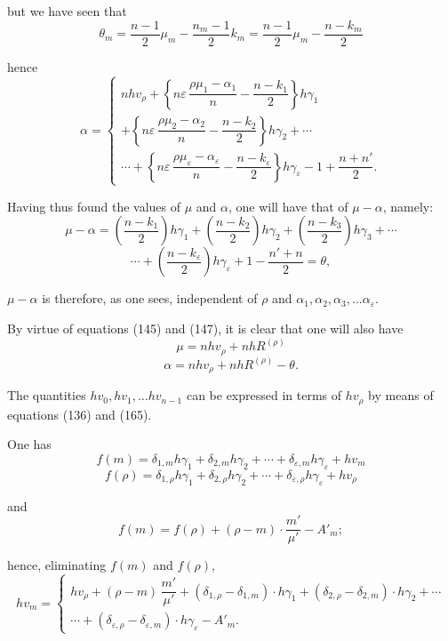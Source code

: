 \documentclass{article}
\begin{document}
but we have seen that
\[ \theta_m = \frac{n-1}{2}\mu_m - \frac{n_m-1}{2}k_m = \frac{n-1}{2}\mu_m - \frac{n-k_m}{2} \]

hence
\[ \alpha = \begin{cases}
nhv_\rho + \left\{n\varepsilon\,\dfrac{\rho\mu_1-\alpha_1}{n} - \dfrac{n-k_1}{2}\right\}h\gamma_1 \\
+ \left\{n\varepsilon\,\dfrac{\rho\mu_2-\alpha_2}{n} - \dfrac{n-k_2}{2}\right\}h\gamma_2+\cdots \\
\cdots+\left\{n\varepsilon\,\dfrac{\rho\mu_\varepsilon-\alpha_\varepsilon}{n}-\dfrac{n-k_\varepsilon}{2}\right\}h\gamma_\varepsilon-1+\dfrac{n+n'}{2}. \tag{171}
\end{cases} \]

Having thus found the values of $\mu$ and $\alpha$, one will have that of $\mu-\alpha$, namely:
\[ \mu-\alpha = \left(\frac{n-k_1}{2}\right)h\gamma_1 + \left(\frac{n-k_2}{2}\right)h\gamma_2 + \left(\frac{n-k_3}{2}\right)h\gamma_3+\cdots \]
\[ \cdots+\left(\frac{n-k_\varepsilon}{2}\right)h\gamma_\varepsilon+1-\frac{n'+n}{2} = \theta, \tag{172} \]

$\mu-\alpha$ is therefore, as one sees, independent of $\rho$ and $\alpha_1, \alpha_2, \alpha_3, \ldots \alpha_\varepsilon$.

By virtue of equations (145) and (147), it is clear that one will also have
\[ \mu = nhv_\rho + nhR^{(\rho)} \tag{173} \]
\[ \alpha = nhv_\rho + nhR^{(\rho)} - \theta. \tag{174} \]

The quantities $hv_0, hv_1, \ldots hv_{n-1}$ can be expressed in terms of $hv_\rho$ by means of equations (136) and (165).

One has
\[ f(m) = \delta_{1,m}h\gamma_1+\delta_{2,m}h\gamma_2+\cdots+\delta_{\varepsilon,m}h\gamma_\varepsilon+hv_m \]
\[ f(\rho) = \delta_{1,\rho}h\gamma_1+\delta_{2,\rho}h\gamma_2+\cdots+\delta_{\varepsilon,\rho}h\gamma_\varepsilon+hv_\rho \]

and
\[ f(m) = f(\rho) + (\rho-m) \cdot \frac{m'}{\mu'} - A'_m; \]

hence, eliminating $f(m)$ and $f(\rho)$,
\[ hv_m = \begin{cases}
hv_\rho + (\rho-m)\,\dfrac{m'}{\mu'} + (\delta_{1,\rho}-\delta_{1,m}) \cdot h\gamma_1 + (\delta_{2,\rho}-\delta_{2,m}) \cdot h\gamma_2 + \cdots \\
\cdots + (\delta_{\varepsilon,\rho}-\delta_{\varepsilon,m}) \cdot h\gamma_\varepsilon - A'_m.
\end{cases} \]
\end{document}
